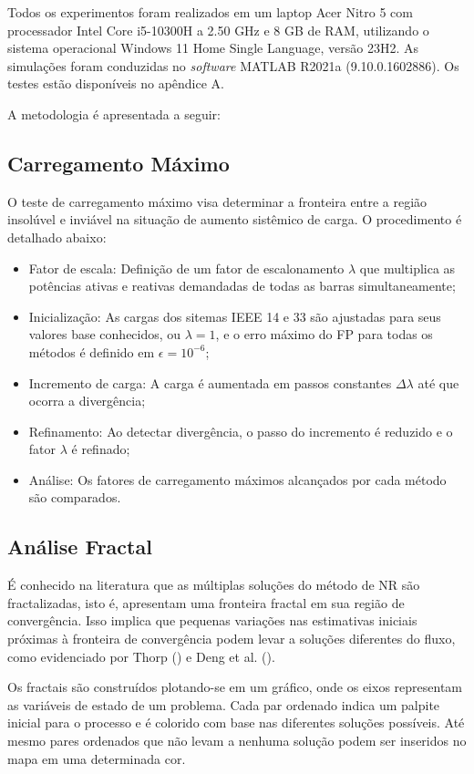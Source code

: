 Todos os experimentos foram realizados em um laptop Acer Nitro 5 com processador Intel Core i5-10300H a 2.50 GHz e 8 GB de RAM, utilizando o sistema operacional Windows 11 Home Single Language, versão 23H2. As simulações foram conduzidas no \textit{software} MATLAB R2021a (9.10.0.1602886). Os testes estão disponíveis no apêndice A.

A metodologia é apresentada a seguir:

\subsection{Carregamento Máximo}
O teste de carregamento máximo visa determinar a fronteira entre a região insolúvel e inviável na situação de aumento sistêmico de carga. O procedimento é detalhado abaixo:
\begin{itemize}
    \item Fator de escala: Definição de um fator de escalonamento $\lambda$ que multiplica as potências ativas e reativas demandadas de todas as barras simultaneamente;
    \item Inicialização: As cargas dos sitemas IEEE 14 e 33 são ajustadas para seus valores base conhecidos, ou $\lambda = 1$, e o erro máximo do \ac{FP} para todas os métodos é definido em  $\epsilon = 10^{-6}$;
    \item Incremento de carga: A carga é aumentada em passos constantes $\Delta \lambda$ até que ocorra a divergência;
    \item Refinamento: Ao detectar divergência, o passo do incremento é reduzido e o fator $\lambda$ é refinado;
    \item Análise: Os fatores de carregamento máximos alcançados por cada método são comparados.
\end{itemize}
\subsection{Análise Fractal}
É conhecido na literatura que as múltiplas soluções do método de \ac{NR} são fractalizadas, isto é, apresentam uma fronteira fractal em sua região de convergência. Isso implica que pequenas variações nas estimativas iniciais próximas à fronteira de convergência podem levar a soluções diferentes do fluxo, como evidenciado por Thorp (\citeyear{thorp}) e Deng et al. (\citeyear{convergence_region}).

Os fractais são construídos plotando-se em um gráfico, onde os eixos representam as variáveis de estado de um problema. Cada par ordenado indica um palpite inicial para o processo e é colorido com base nas diferentes soluções possíveis. Até mesmo pares ordenados que não levam a nenhuma solução podem ser inseridos no mapa em uma determinada cor.

